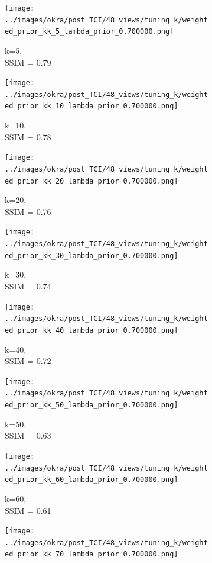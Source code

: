 \documentclass[journal]{IEEEtran}
\begin{document}
\begin{figure}[h]
    \begin{subfigure}[b]{0.24\linewidth}
        \texttt{[image: ../images/okra/post\_TCI/48\_views/tuning\_k/weighted\_prior\_kk\_5\_lambda\_prior\_0.700000.png]}
        \caption{k=5,\\ SSIM = 0.79}
     \end{subfigure}     
  \begin{subfigure}[b]{0.24\linewidth}
        \texttt{[image: ../images/okra/post\_TCI/48\_views/tuning\_k/weighted\_prior\_kk\_10\_lambda\_prior\_0.700000.png]}
        \caption{k=10,\\ SSIM = 0.78}
     \end{subfigure} 
  \begin{subfigure}[b]{0.24\linewidth}
        \texttt{[image: ../images/okra/post\_TCI/48\_views/tuning\_k/weighted\_prior\_kk\_20\_lambda\_prior\_0.700000.png]}
        \caption{k=20,\\ SSIM = 0.76}
     \end{subfigure}
  \begin{subfigure}[b]{0.24\linewidth}
        \texttt{[image: ../images/okra/post\_TCI/48\_views/tuning\_k/weighted\_prior\_kk\_30\_lambda\_prior\_0.700000.png]}
        \caption{k=30,\\ SSIM = 0.74}
     \end{subfigure}
  \begin{subfigure}[b]{0.24\linewidth}
        \texttt{[image: ../images/okra/post\_TCI/48\_views/tuning\_k/weighted\_prior\_kk\_40\_lambda\_prior\_0.700000.png]}
        \caption{k=40,\\ SSIM = 0.72}
     \end{subfigure}
  \begin{subfigure}[b]{0.24\linewidth}
        \texttt{[image: ../images/okra/post\_TCI/48\_views/tuning\_k/weighted\_prior\_kk\_50\_lambda\_prior\_0.700000.png]}
        \caption{k=50,\\ SSIM = 0.63}
     \end{subfigure}
   \begin{subfigure}[b]{0.24\linewidth}
        \texttt{[image: ../images/okra/post\_TCI/48\_views/tuning\_k/weighted\_prior\_kk\_60\_lambda\_prior\_0.700000.png]}
        \caption{k=60,\\ SSIM = 0.61}
     \end{subfigure}
   \begin{subfigure}[b]{0.24\linewidth}
        \texttt{[image: ../images/okra/post\_TCI/48\_views/tuning\_k/weighted\_prior\_kk\_70\_lambda\_prior\_0.700000.png]}

\end{subfigure}
\end{figure}
\end{document}
